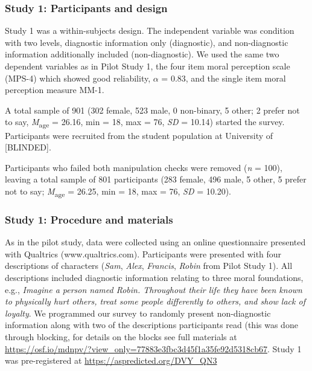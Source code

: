 \documentclass[
  english,
  man,floatsintext]{apa7}
\begin{document}
\hypertarget{study-1-participants-and-design}{%
\subsubsection{Study 1: Participants and design}\label{study-1-participants-and-design}}

Study 1 was a within-subjects design. The independent variable was condition with two levels, diagnostic information only (diagnostic), and non-diagnostic information additionally included (non-diagnostic). We used the same two dependent variables as in Pilot Study 1, the four item moral perception scale (MPS-4) which showed good reliability, \(\alpha\) = 0.83, and the single item moral perception measure MM-1.

A total sample of 901 (302 female, 523 male, 0 non-binary, 5 other; 2 prefer not to say, \emph{M}\textsubscript{age} = 26.16, min = 18, max = 76, \emph{SD} = 10.14) started the survey. Participants were recruited from the student population at University of {[}BLINDED{]}.

Participants who failed both manipulation checks were removed (\emph{n} = 100), leaving a total sample of 801 participants (283 female, 496 male, 5 other, 5 prefer not to say; \emph{M}\textsubscript{age} = 26.25, min = 18, max = 76, \emph{SD} = 10.20).

\hypertarget{study-1-procedure-and-materials}{%
\subsubsection{Study 1: Procedure and materials}\label{study-1-procedure-and-materials}}

As in the pilot study, data were collected using an online questionnaire presented with Qualtrics (www.qualtrics.com). Participants were presented with four descriptions of characters (\emph{Sam}, \emph{Alex}, \emph{Francis}, \emph{Robin} from Pilot Study 1). All descriptions included diagnostic information relating to three moral foundations, e.g., \emph{Imagine a person named Robin. Throughout their life they have been known to physically hurt others, treat some people differently to others, and show lack of loyalty}. We programmed our survey to randomly present non-diagnostic information along with two of the descriptions participants read (this was done through blocking, for details on the blocks see full materials at \color{blue}\url{https://osf.io/mdnpv/?view_only=77883e3fbc3d45f1a35fe92d5318cb67}\color{black}. Study 1 was pre-registered at \color{blue}\url{https://aspredicted.org/DVY_QN3}\color{black}
\end{document}
